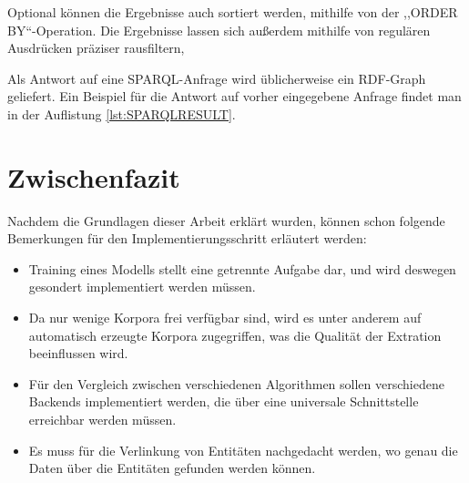 Optional können die Ergebnisse auch sortiert werden, mithilfe von der ,,ORDER BY``-Operation. Die Ergebnisse lassen sich außerdem mithilfe von regulären Ausdrücken präziser rausfiltern,

Als Antwort auf eine SPARQL-Anfrage wird üblicherweise ein RDF-Graph geliefert. Ein Beispiel für die Antwort auf vorher eingegebene Anfrage findet man in der Auflistung \ref{lst:SPARQLRESULT}.

\lstset{language=XML}


\section{Zwischenfazit}
Nachdem die Grundlagen dieser Arbeit erklärt wurden, können schon folgende Bemerkungen für den Implementierungsschritt erläutert werden:
\begin{itemize}
\item Training eines Modells stellt eine getrennte Aufgabe dar, und wird deswegen gesondert implementiert werden müssen.
\item Da nur wenige Korpora frei verfügbar sind, wird es unter anderem auf automatisch erzeugte Korpora zugegriffen, was die Qualität der Extration beeinflussen wird.
\item Für den Vergleich zwischen verschiedenen Algorithmen sollen verschiedene Backends implementiert werden, die über eine universale Schnittstelle erreichbar werden müssen.
\item Es muss für die Verlinkung von Entitäten nachgedacht werden, wo genau die Daten über die Entitäten gefunden werden können.
\end{itemize}
